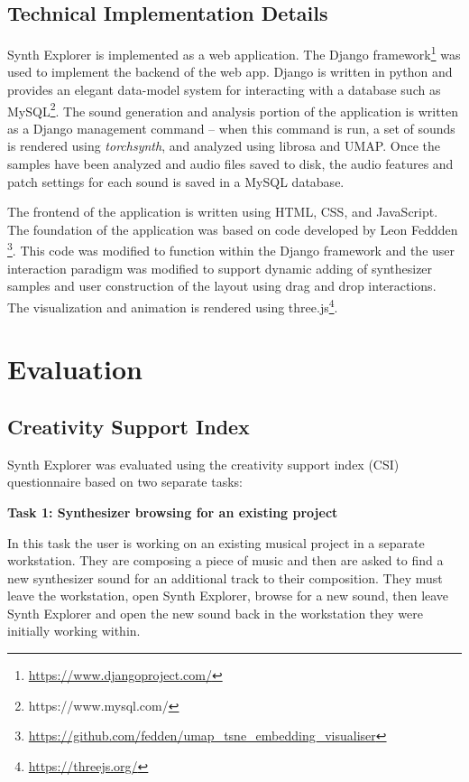 \subsection{Technical Implementation Details}
Synth Explorer is implemented as a web application. The Django framework\footnote{\url{https://www.djangoproject.com/}} was used to implement the backend of the web app. Django is written in python and provides an elegant data-model system for interacting with a database such as MySQL\footnote{{https://www.mysql.com/}}. The sound generation and analysis portion of the application is written as a Django management command -- when this command is run, a set of sounds is rendered using \textit{torchsynth}, and analyzed using librosa and UMAP. Once the samples have been analyzed and audio files saved to disk, the audio features and patch settings for each sound is saved in a MySQL database.

The frontend of the application is written using HTML, CSS, and JavaScript. The foundation of the application was based on code developed by Leon Feddden \footnote{\url{https://github.com/fedden/umap_tsne_embedding_visualiser}}. This code was modified to function within the Django framework and the user interaction paradigm was modified to support dynamic adding of synthesizer samples and user construction of the layout using drag and drop interactions. The visualization and animation is rendered using three.js\footnote{\url{https://threejs.org/}}.


\section{Evaluation}
\subsection{Creativity Support Index}
Synth Explorer was evaluated using the creativity support index (CSI) questionnaire based on two separate tasks:

\textbf{Task 1: Synthesizer browsing for an existing project}

In this task the user is working on an existing musical project in a separate workstation. They are composing a piece of music and then are asked to find a new synthesizer sound for an additional track to their composition. They must leave the workstation,
open Synth Explorer, browse for a new sound, then leave Synth Explorer and open the new sound back in the workstation they were initially working within.

